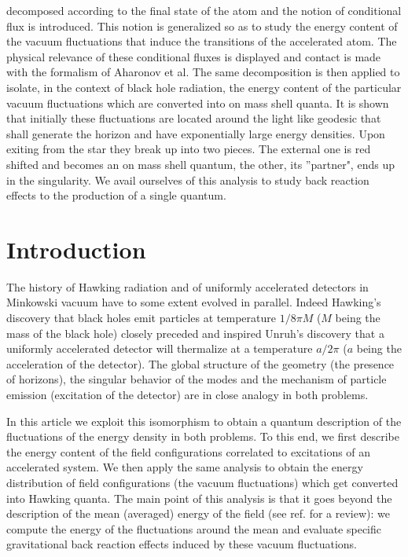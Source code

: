\documentclass[12pt]{article}
\begin{document}
decomposed according to the final state of the atom and the notion of
conditional flux is introduced.
This notion is
generalized so as to study
the energy content of the
vacuum fluctuations that induce the transitions of the accelerated
atom. The physical relevance of these conditional fluxes is displayed
and contact is made with the formalism of Aharonov et al.
The same
decomposition is then applied to isolate,
in the context of black hole radiation,
the energy content of the particular vacuum
fluctuations which are converted
into on mass shell quanta.
It is shown that initially these fluctuations
are located around the light like geodesic
that shall generate the horizon and
have exponentially
large energy densities. Upon
exiting from the star they break up into two pieces. The external one is red
shifted and becomes an
on mass shell
quantum, the other, its ''partner", ends up in
the singularity.  We avail ourselves of this analysis to study
back reaction effects
to the production of a
single quantum.
\vfill \newpage


\section{Introduction}\label{Intro}


The history of Hawking radiation and of uniformly accelerated detectors in
Minkowski vacuum have to some extent evolved in parallel. Indeed
Hawking's discovery\cite{hawk2} that black holes emit particles at
temperature $1/8\pi M$ ($M$ being the mass of the black hole)
 closely preceded and inspired Unruh's
discovery\cite{Unruh} that a uniformly accelerated detector will thermalize at
a
temperature $a/2\pi $ ($a$ being the acceleration of the detector).
The global structure of the geometry (the
presence of horizons), the singular behavior of the modes and the mechanism of
particle emission (excitation of the detector) are in close analogy in both
problems.

In this article we exploit this isomorphism to obtain a quantum description
of the fluctuations of the energy density in both problems. To this end,
we first describe the energy content of the
field configurations correlated to excitations of
an accelerated system.
We then apply the same analysis to obtain
the energy distribution of field
configurations (the vacuum fluctuations) which get converted into Hawking
quanta. The main point of this analysis is that it
goes beyond the description of the mean (averaged) energy of the field (see
ref. \cite{birreld} for a review): we compute the energy of the
fluctuations around the mean
and evaluate specific gravitational back reaction effects
induced by these vacuum fluctuations.
\end{document}

